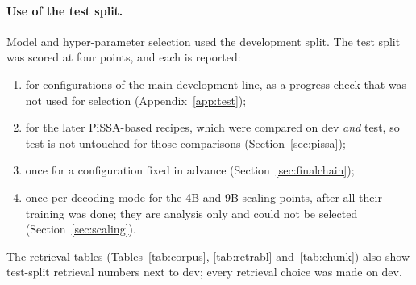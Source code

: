 \documentclass[11pt,a4paper]{article}
\begin{document}
\paragraph{Use of the test split.}
Model and hyper-parameter selection used the development split. The test split was scored at four points, and each is reported:
\begin{enumerate}[leftmargin=*]
\item for configurations of the main development line, as a progress check that was not used for selection (Appendix~\ref{app:test});
\item for the later PiSSA-based recipes, which were compared on dev \emph{and} test, so test is not untouched for those comparisons (Section~\ref{sec:pissa});
\item once for a configuration fixed in advance (Section~\ref{sec:finalchain});
\item once per decoding mode for the 4B and 9B scaling points, after all their training was done; they are analysis only and could not be selected (Section~\ref{sec:scaling}).
\end{enumerate}
The retrieval tables (Tables~\ref{tab:corpus}, \ref{tab:retrabl} and~\ref{tab:chunk}) also show test-split retrieval numbers next to dev; every retrieval choice was made on dev.

\end{document}
